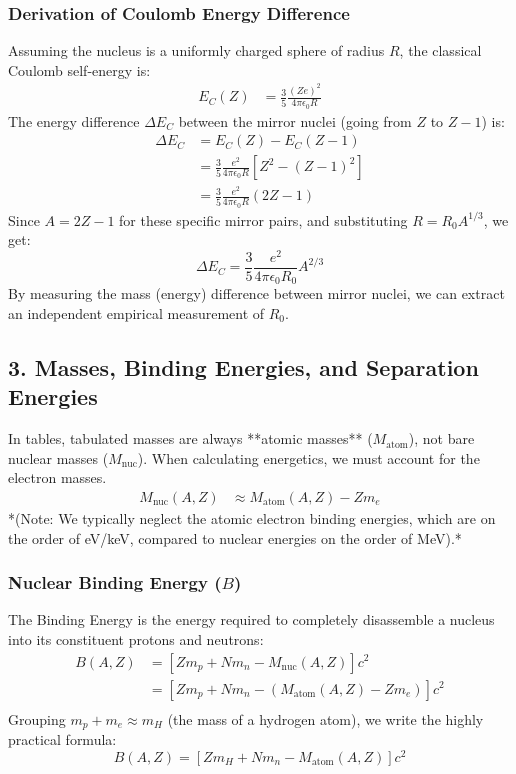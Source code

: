 \subsubsection*{Derivation of Coulomb Energy Difference}
Assuming the nucleus is a uniformly charged sphere of radius $R$, the classical Coulomb self-energy is:
\begin{align*}\label{Eq:Coluomb Energy Difference}
E_C(Z) &= \frac{3}{5} \frac{(Z e)^2}{4\pi\epsilon_0 R}
\end{align*}
The energy difference $\Delta E_C$ between the mirror nuclei (going from $Z$ to $Z-1$) is:
\begin{align*}
\Delta E_C &= E_C(Z) - E_C(Z-1) \\
&= \frac{3}{5} \frac{e^2}{4\pi\epsilon_0 R} \left[ Z^2 - (Z-1)^2 \right] \\
&= \frac{3}{5} \frac{e^2}{4\pi\epsilon_0 R} (2Z - 1)
\end{align*}
Since $A = 2Z - 1$ for these specific mirror pairs, and substituting $R = R_0 A^{1/3}$, we get:
\begin{equation}
    \Delta E_C = \frac{3}{5} \frac{e^2}{4\pi\epsilon_0 R_0} A^{2/3}
    \label{eq:lec02:coulomb_diff}
\end{equation}
By measuring the mass (energy) difference between mirror nuclei, we can extract an independent empirical measurement of $R_0$.

\subsection*{3. Masses, Binding Energies, and Separation Energies}
In tables, tabulated masses are always **atomic masses** ($M_{\text{atom}}$), not bare nuclear masses ($M_{\text{nuc}}$). When calculating energetics, we must account for the electron masses.
\begin{align*}
M_{\text{nuc}}(A,Z) &\approx M_{\text{atom}}(A,Z) - Z m_e
\end{align*}
*(Note: We typically neglect the atomic electron binding energies, which are on the order of eV/keV, compared to nuclear energies on the order of MeV).*

\subsubsection*{Nuclear Binding Energy ($B$)}
The Binding Energy is the energy required to completely disassemble a nucleus into its constituent protons and neutrons:
\begin{align*}
B(A,Z) &= \left[ Z m_p + N m_n - M_{\text{nuc}}(A,Z) \right] c^2 \\
&= \left[ Z m_p + N m_n - (M_{\text{atom}}(A,Z) - Z m_e) \right] c^2 \\
\end{align*}
Grouping $m_p + m_e \approx m_H$ (the mass of a hydrogen atom), we write the highly practical formula:
\begin{equation}\boxed{
    B(A,Z) = \left[ Z m_H + N m_n - M_{\text{atom}}(A,Z) \right] c^2
    \label{eq:lec02:binding_energy}
}\end{equation}

